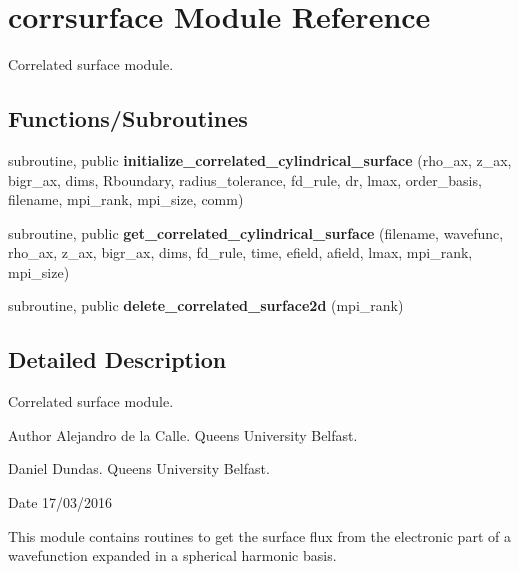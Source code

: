 \hypertarget{namespacecorrsurface}{}\section{corrsurface Module Reference}
\label{namespacecorrsurface}


Correlated surface module.  


\subsection*{Functions/\+Subroutines}
\begin{DoxyCompactItemize}
\item 
\mbox{\label{namespacecorrsurface_a613097c30fc43c1bc43cf7736285868d}} 
subroutine, public {\bfseries initialize\+\_\+correlated\+\_\+cylindrical\+\_\+surface} (rho\+\_\+ax, z\+\_\+ax, bigr\+\_\+ax, dims, Rboundary, radius\+\_\+tolerance, fd\+\_\+rule, dr, lmax, order\+\_\+basis, filename, mpi\+\_\+rank, mpi\+\_\+size, comm)
\item 
\mbox{\label{namespacecorrsurface_aea44c2b6267315f250440da5998ca237}} 
subroutine, public {\bfseries get\+\_\+correlated\+\_\+cylindrical\+\_\+surface} (filename, wavefunc, rho\+\_\+ax, z\+\_\+ax, bigr\+\_\+ax, dims, fd\+\_\+rule, time, efield, afield, lmax, mpi\+\_\+rank, mpi\+\_\+size)
\item 
\mbox{\label{namespacecorrsurface_ada8b8eb0002e2495f8e1c12d0745e100}} 
subroutine, public {\bfseries delete\+\_\+correlated\+\_\+surface2d} (mpi\+\_\+rank)
\end{DoxyCompactItemize}


\subsection{Detailed Description}
Correlated surface module. 

\begin{DoxyAuthor}{Author}
Alejandro de la Calle. Queen\textquotesingle{}s University Belfast. 

Daniel Dundas. Queen\textquotesingle{}s University Belfast. 
\end{DoxyAuthor}
\begin{DoxyDate}{Date}
17/03/2016
\end{DoxyDate}
This module contains routines to get the surface flux from the electronic part of a wavefunction expanded in a spherical harmonic basis. 